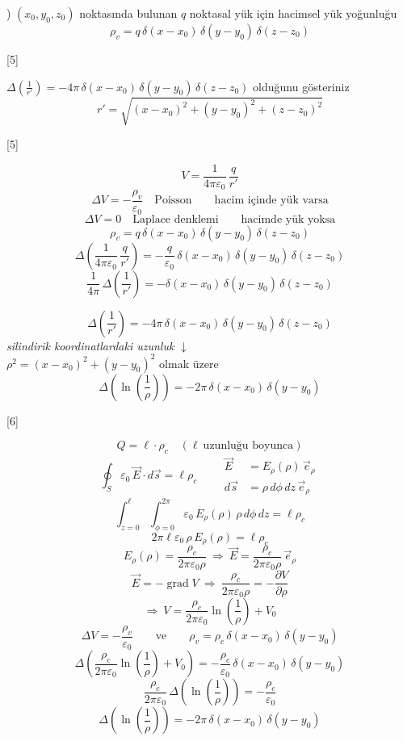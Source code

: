 \documentclass[11pt,a4paper]{article}
\begin{document}
) $(x_0,y_0,z_0)$ noktasında bulunan $q$ noktasal yük için hacimsel yük yoğunluğu
\[
\rho_v=q\,\delta(x-x_0)\,\delta(y-y_0)\,\delta(z-z_0)
\]

[5]

\begin{ornek}[1]
$\Delta\!\left(\frac{1}{r'}\right)=-4\pi\,\delta(x-x_0)\,\delta(y-y_0)\,\delta(z-z_0)$ olduğunu gösteriniz
\[
r'=\sqrt{(x-x_0)^2+(y-y_0)^2+(z-z_0)^2}
\]
\end{ornek}

[5]

\[
V=\frac{1}{4\pi\varepsilon_0}\,\frac{q}{r'}
\]
\[
\Delta V=-\frac{\rho_v}{\varepsilon_0}\quad\text{Poisson}\qquad\text{hacim içinde yük varsa}
\]
\[
\Delta V=0\quad\text{Laplace denklemi}\qquad\text{hacimde yük yoksa}
\]
\[
\rho_v=q\,\delta(x-x_0)\,\delta(y-y_0)\,\delta(z-z_0)
\]
\[
\Delta\!\left(\frac{1}{4\pi\varepsilon_0}\,\frac{q}{r'}\right)=-\frac{q}{\varepsilon_0}\,\delta(x-x_0)\,\delta(y-y_0)\,\delta(z-z_0)
\]
\[
\frac{1}{4\pi}\,\Delta\!\left(\frac{1}{r'}\right)=-\delta(x-x_0)\,\delta(y-y_0)\,\delta(z-z_0)
\]

\[
\Delta\!\left(\frac{1}{r'}\right)=-4\pi\,\delta(x-x_0)\,\delta(y-y_0)\,\delta(z-z_0)
\]
\noindent\textit{silindirik koordinatlardaki uzunluk} $\downarrow$\\
$\rho^2=(x-x_0)^2+(y-y_0)^2$ olmak üzere
\[
\Delta\!\left(\ln\left(\frac{1}{\rho}\right)\right)=-2\pi\,\delta(x-x_0)\,\delta(y-y_0)
\]

[6]

\[
Q=\ell\cdot\rho_c\quad(\ell\ \text{uzunluğu boyunca})
\]
\[
\oint_S\varepsilon_0\,\vec E\cdot d\vec s=\ell\rho_c
\qquad
\begin{aligned}
\vec E&=E_\rho(\rho)\,\vec e_\rho\\
d\vec s&=\rho\,d\phi\,dz\,\vec e_\rho
\end{aligned}
\]
\[
\int_{z=0}^{\ell}\int_{\phi=0}^{2\pi}\varepsilon_0\,E_\rho(\rho)\,\rho\,d\phi\,dz=\ell\rho_c
\]
\[
2\pi\ell\varepsilon_0\,\rho\,E_\rho(\rho)=\ell\rho_c
\]
\[
E_\rho(\rho)=\frac{\rho_c}{2\pi\varepsilon_0\rho}\ \Rightarrow\ \vec E=\frac{\rho_c}{2\pi\varepsilon_0\rho}\,\vec e_\rho
\]
\[
\vec E=-\operatorname{grad}V\ \Rightarrow\ \frac{\rho_c}{2\pi\varepsilon_0\rho}=-\frac{\partial V}{\partial\rho}
\]
\[
\Rightarrow\ V=\frac{\rho_c}{2\pi\varepsilon_0}\ln\left(\frac{1}{\rho}\right)+V_0
\]
\[
\Delta V=-\frac{\rho_v}{\varepsilon_0}\qquad\text{ve}\qquad\rho_v=\rho_c\,\delta(x-x_0)\,\delta(y-y_0)
\]
\[
\Delta\!\left(\frac{\rho_c}{2\pi\varepsilon_0}\ln\left(\frac{1}{\rho}\right)+V_0\right)=-\frac{\rho_c}{\varepsilon_0}\,\delta(x-x_0)\,\delta(y-y_0)
\]
\[
\frac{\rho_c}{2\pi\varepsilon_0}\,\Delta\!\left(\ln\left(\frac{1}{\rho}\right)\right)=-\frac{\rho_c}{\varepsilon_0}
\]
\[
\Delta\!\left(\ln\left(\frac{1}{\rho}\right)\right)=-2\pi\,\delta(x-x_0)\,\delta(y-y_0)
\]
\end{document}
